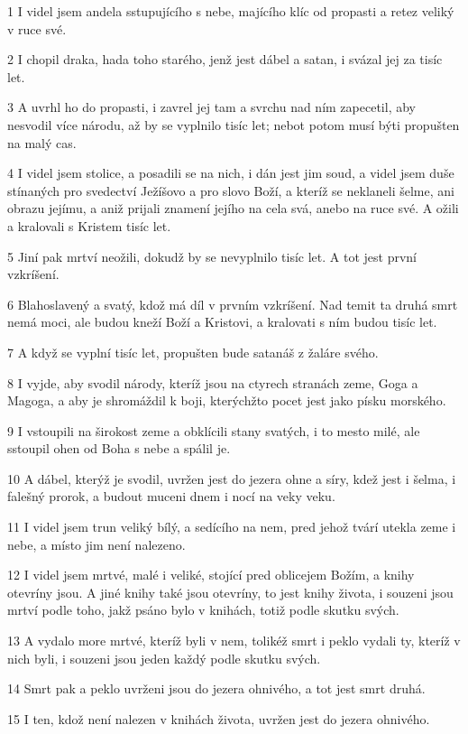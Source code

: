 \par 1 I videl jsem andela sstupujícího s nebe, majícího klíc od propasti a retez veliký v ruce své.
\par 2 I chopil draka, hada toho starého, jenž jest dábel a satan, i svázal jej za tisíc let.
\par 3 A uvrhl ho do propasti, i zavrel jej tam a svrchu nad ním zapecetil, aby nesvodil více národu, až by se vyplnilo tisíc let; nebot potom musí býti propušten na malý cas.
\par 4 I videl jsem stolice, a posadili se na nich, i dán jest jim soud, a videl jsem duše stínaných pro svedectví Ježíšovo a pro slovo Boží, a kteríž se neklaneli šelme, ani obrazu jejímu, a aniž prijali znamení jejího na cela svá, anebo na ruce své. A ožili a kralovali s Kristem tisíc let.
\par 5 Jiní pak mrtví neožili, dokudž by se nevyplnilo tisíc let. A tot jest první vzkríšení.
\par 6 Blahoslavený a svatý, kdož má díl v prvním vzkríšení. Nad temit ta druhá smrt nemá moci, ale budou kneží Boží a Kristovi, a kralovati s ním budou tisíc let.
\par 7 A když se vyplní tisíc let, propušten bude satanáš z žaláre svého.
\par 8 I vyjde, aby svodil národy, kteríž jsou na ctyrech stranách zeme, Goga a Magoga, a aby je shromáždil k boji, kterýchžto pocet jest jako písku morského.
\par 9 I vstoupili na širokost zeme a obklícili stany svatých, i to mesto milé, ale sstoupil ohen od Boha s nebe a spálil je.
\par 10 A dábel, kterýž je svodil, uvržen jest do jezera ohne a síry, kdež jest i šelma, i falešný prorok, a budout muceni dnem i nocí na veky veku.
\par 11 I videl jsem trun veliký bílý, a sedícího na nem, pred jehož tvárí utekla zeme i nebe, a místo jim není nalezeno.
\par 12 I videl jsem mrtvé, malé i veliké, stojící pred oblicejem Božím, a knihy otevríny jsou. A jiné knihy také jsou otevríny, to jest knihy života, i souzeni jsou mrtví podle toho, jakž psáno bylo v knihách, totiž podle skutku svých.
\par 13 A vydalo more mrtvé, kteríž byli v nem, tolikéž smrt i peklo vydali ty, kteríž v nich byli, i souzeni jsou jeden každý podle skutku svých.
\par 14 Smrt pak a peklo uvrženi jsou do jezera ohnivého, a tot jest smrt druhá.
\par 15 I ten, kdož není nalezen v knihách života, uvržen jest do jezera ohnivého.

